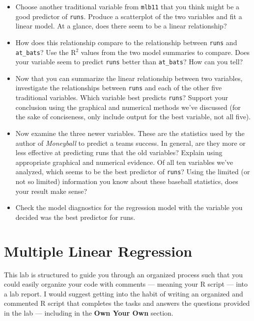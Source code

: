\documentclass[]{book}
\theoremstyle{definition}
\theoremstyle{definition}
\theoremstyle{definition}
\theoremstyle{remark}
\begin{document}
\begin{itemize}
\item
  Choose another traditional variable from \texttt{mlb11} that you think
  might be a good predictor of \texttt{runs}. Produce a scatterplot of
  the two variables and fit a linear model. At a glance, does there seem
  to be a linear relationship?
\item
  How does this relationship compare to the relationship between
  \texttt{runs} and \texttt{at\_bats}? Use the R\(^2\) values from the
  two model summaries to compare. Does your variable seem to predict
  \texttt{runs} better than \texttt{at\_bats}? How can you tell?
\item
  Now that you can summarize the linear relationship between two
  variables, investigate the relationships between \texttt{runs} and
  each of the other five traditional variables. Which variable best
  predicts \texttt{runs}? Support your conclusion using the graphical
  and numerical methods we've discussed (for the sake of conciseness,
  only include output for the best variable, not all five).
\item
  Now examine the three newer variables. These are the statistics used
  by the author of \emph{Moneyball} to predict a teams success. In
  general, are they more or less effective at predicting runs that the
  old variables? Explain using appropriate graphical and numerical
  evidence. Of all ten variables we've analyzed, which seems to be the
  best predictor of \texttt{runs}? Using the limited (or not so limited)
  information you know about these baseball statistics, does your result
  make sense?
\item
  Check the model diagnostics for the regression model with the variable
  you decided was the best predictor for runs.
\end{itemize}

\hypertarget{multiple-linear-regression}{%
\chapter{Multiple Linear Regression}\label{multiple-linear-regression}}

This lab is structured to guide you through an organized process such
that you could easily organize your code with comments --- meaning your
R script --- into a lab report. I would suggest getting into the habit
of writing an organized and commented R script that completes the tasks
and answers the questions provided in the lab --- including in the
\textbf{Own Your Own} section.
\end{document}
